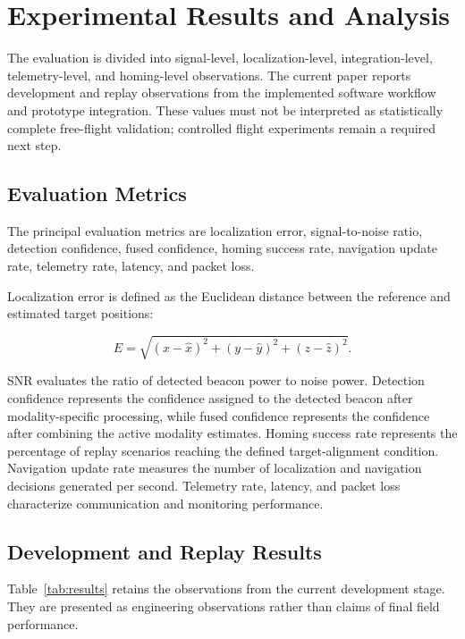 \documentclass[conference]{IEEEtran}
\begin{document}
\section{Experimental Results and Analysis}

The evaluation is divided into signal-level, localization-level,
integration-level, telemetry-level, and homing-level observations. The current
paper reports development and replay observations from the implemented
software workflow and prototype integration. These values must not be
interpreted as statistically complete free-flight validation; controlled
flight experiments remain a required next step.

\subsection{Evaluation Metrics}

The principal evaluation metrics are localization error, signal-to-noise ratio,
detection confidence, fused confidence, homing success rate, navigation update
rate, telemetry rate, latency, and packet loss.

Localization error is defined as the Euclidean distance between the reference
and estimated target positions:

\begin{equation}
E=\sqrt{(x-\hat{x})^2+(y-\hat{y})^2+(z-\hat{z})^2}.
\end{equation}

SNR evaluates the ratio of detected beacon power to noise power. Detection
confidence represents the confidence assigned to the detected beacon after
modality-specific processing, while fused confidence represents the confidence
after combining the active modality estimates. Homing success rate represents
the percentage of replay scenarios reaching the defined target-alignment
condition. Navigation update rate measures the number of localization and
navigation decisions generated per second. Telemetry rate, latency, and packet
loss characterize communication and monitoring performance.

\subsection{Development and Replay Results}

Table~\ref{tab:results} retains the observations from the current development
stage. They are presented as engineering observations rather than claims of
final field performance.
\end{document}
